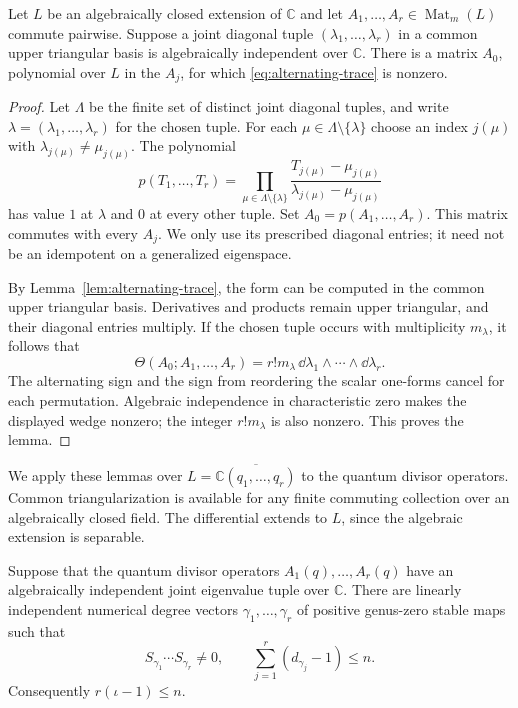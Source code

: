 \begin{lemma}
\label{lem:spectral-trace}
Let $L$ be an algebraically closed extension of $\mathbb C$ and let
$A_1,\ldots,A_r\in\operatorname{Mat}_m(L)$ commute pairwise.
Suppose a joint diagonal tuple $(\lambda_1,\ldots,\lambda_r)$ in a
common upper triangular basis is algebraically independent over
$\mathbb C$.  There is a matrix $A_0$, polynomial over $L$ in the
$A_j$, for which \eqref{eq:alternating-trace} is nonzero.
\end{lemma}

\begin{proof}
Let $\Lambda$ be the finite set of distinct joint diagonal tuples,
and write $\lambda=(\lambda_1,\ldots,\lambda_r)$ for the chosen tuple.
For each $\mu\in\Lambda\setminus\{\lambda\}$ choose an index $j(\mu)$
with $\lambda_{j(\mu)}\ne\mu_{j(\mu)}$.  The polynomial
\[
 p(T_1,\ldots,T_r)
 =\prod_{\mu\in\Lambda\setminus\{\lambda\}}
   \frac{T_{j(\mu)}-\mu_{j(\mu)}}
        {\lambda_{j(\mu)}-\mu_{j(\mu)}}
\]
has value $1$ at $\lambda$ and $0$ at every other tuple.  Set
$A_0=p(A_1,\ldots,A_r)$.  This matrix commutes with every $A_j$.
We only use its prescribed diagonal entries; it need not be an
idempotent on a generalized eigenspace.

By Lemma~\ref{lem:alternating-trace}, the form can be computed in the
common upper triangular basis.  Derivatives and products remain upper
triangular, and their diagonal entries multiply.  If the chosen tuple
occurs with multiplicity $m_\lambda$, it follows that
\[
 \Theta(A_0;A_1,\ldots,A_r)
 =r!m_\lambda\,\dd\lambda_1\wedge\cdots\wedge \dd\lambda_r.
\]
The alternating sign and the sign from reordering the scalar one-forms
cancel for each permutation.  Algebraic independence in characteristic
zero makes the displayed wedge nonzero; the integer $r!m_\lambda$ is
also nonzero.  This proves the lemma.
\end{proof}

We apply these lemmas over
$L=\overline{\mathbb C(q_1,\ldots,q_r)}$ to the quantum divisor
operators.  Common triangularization is available for any finite
commuting collection over an algebraically closed field.  The
differential extends to $L$, since the algebraic extension is
separable.

\begin{proposition}
\label{prop:independent-correspondences}
Suppose that the quantum divisor operators $A_1(q),\ldots,A_r(q)$
have an algebraically independent joint eigenvalue tuple over
$\mathbb C$.  There are linearly independent numerical degree vectors
$\gamma_1,\ldots,\gamma_r$ of positive genus-zero stable maps such that
\begin{equation}
\label{eq:nonzero-independent-product}
 S_{\gamma_1}\cdots S_{\gamma_r}\ne0,
 \qquad
 \sum_{j=1}^r(d_{\gamma_j}-1)\le n.
\end{equation}
Consequently $r(\iota-1)\le n$.
\end{proposition}

